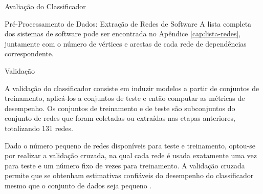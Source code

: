 \begin{section}{Avaliação do Classificador}
\begin{subsection}{Pré-Processamento de Dados: Extração de Redes de Software}
	A lista completa dos sistemas de software pode ser encontrada no Apêndice \ref{cap:lista-redes}, juntamente com o número de vértices e arestas de cada rede de dependências correspondente. %

\end{subsection}

\begin{subsection}{Validação}

	A validação do classificador consiste em induzir modelos a partir de conjuntos de treinamento, aplicá-los a conjuntos de teste e então computar as métricas de desempenho. Os conjuntos de treinamento e de teste são subconjuntos do conjunto de redes que foram coletadas ou extraídas nas etapas anteriores, totalizando 131 redes.
	
	Dado o número pequeno de redes disponíveis para teste e treinamento, optou-se por realizar a validação cruzada, na qual cada rede é usada exatamente uma vez para teste e um número fixo de vezes para treinamento. A validação cruzada permite que se obtenham estimativas confiáveis do desempenho do classificador mesmo que o conjunto de dados seja pequeno \cite{Witten2005}.
	



\end{subsection}
\end{section}
